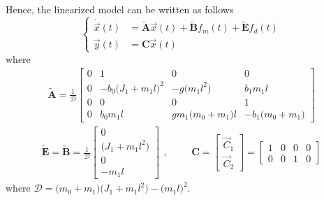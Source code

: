 \documentclass[12pt,a4paper,oneside]{book}
\begin{document}
\begin{onehalfspace}
Hence, the linearized model can be written as follows
\begin{equation}\label{pendulum_on_cart_26}
	\left\lbrace 	\begin{aligned}
		\dot{\vec{x}}(t)&=\tilde{\mathbf{A}}\vec{x}(t)+\tilde{\mathbf{B}}f_m(t) +\tilde{\mathbf{E}}f_d(t) \\[6pt]
		\vec{y}(t)&=\mathbf{C}\vec{x}(t)
	\end{aligned}\right. 
\end{equation}
where
\begin{equation}\label{pendulum_on_cart_27}
	\begin{aligned}
		\tilde{\mathbf{A}}=\frac{1}{\mathcal{D}}\begin{bmatrix}
			0&1&0&0 \\[8pt]		
			0&-b_0\big(J_1+m_1l\big)^2&-g\big(m_1l^2\big)&b_1m_1l \\[8pt]
			0&0&0&1 \\[8pt]
			0&b_0m_1l&gm_1\big(m_0+m_1\big)l&-b_1\big(m_0+m_1\big) 
		\end{bmatrix}
	\end{aligned}
\end{equation}
\begin{equation}\label{pendulum_on_cart_28}
	\begin{aligned}
		\tilde{\mathbf{E}}=\tilde{\mathbf{B}}=\frac{1}{\mathcal{D}}\begin{bmatrix}
			0 \\[8pt]		
			\big(J_1+m_1l^2\big) \\[8pt]
			0 \\[8pt]
			-m_1l
		\end{bmatrix}
	\end{aligned},\qquad
	\begin{aligned}
		{\mathbf{C}}=\begin{bmatrix}
			\vec{C}_1 \\[8pt]		
			\vec{C}_2
		\end{bmatrix}=\begin{bmatrix}
			1&0&0&0 \\[8pt]		
			0&0&1&0
		\end{bmatrix}
	\end{aligned}
\end{equation}
where $\mathcal{D}=\big(m_0+m_1\big)\big(J_1+m_1l^2\big)-\big(m_1l\big)^2$.

\end{onehalfspace}
\end{document}

